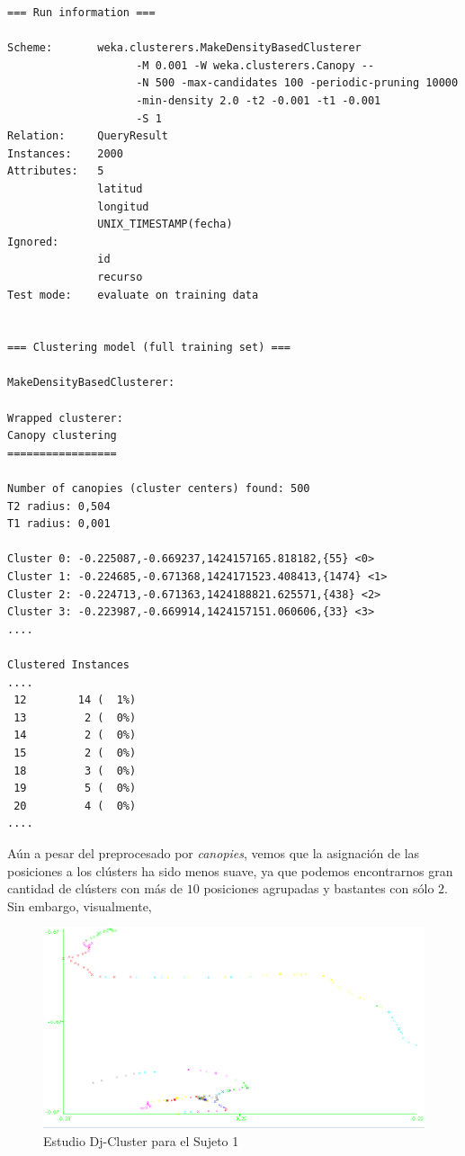 \documentclass[a4paper, 12pt]{article}
\begin{document}
\begin{verbatim}
=== Run information ===

Scheme:       weka.clusterers.MakeDensityBasedClusterer 
					-M 0.001 -W weka.clusterers.Canopy -- 
					-N 500 -max-candidates 100 -periodic-pruning 10000 
					-min-density 2.0 -t2 -0.001 -t1 -0.001 
					-S 1 
Relation:     QueryResult
Instances:    2000
Attributes:   5
              latitud
              longitud
              UNIX_TIMESTAMP(fecha)
Ignored:
              id
              recurso
Test mode:    evaluate on training data


=== Clustering model (full training set) ===

MakeDensityBasedClusterer: 

Wrapped clusterer: 
Canopy clustering
=================

Number of canopies (cluster centers) found: 500
T2 radius: 0,504     
T1 radius: 0,001     

Cluster 0: -0.225087,-0.669237,1424157165.818182,{55} <0>
Cluster 1: -0.224685,-0.671368,1424171523.408413,{1474} <1>
Cluster 2: -0.224713,-0.671363,1424188821.625571,{438} <2>
Cluster 3: -0.223987,-0.669914,1424157151.060606,{33} <3>
....

Clustered Instances
....
 12        14 (  1%)
 13         2 (  0%)
 14         2 (  0%)
 15         2 (  0%)
 18         3 (  0%)
 19         5 (  0%)
 20         4 (  0%)
....
\end{verbatim} 

A\'un a pesar del preprocesado por \textit{canopies}, vemos que la asignaci\'on de las posiciones a los cl\'usters ha sido menos suave, ya que podemos encontrarnos gran cantidad de cl\'usters con m\'as de $10$ posiciones agrupadas y bastantes con s\'olo $2$. Sin embargo, visualmente, \\

\begin{figure}[H]
	\includegraphics[scale=.5]{../comparativa/djClusterSujeto1.png}
	\caption{Estudio Dj-Cluster para el Sujeto 1}
\end{figure}
\end{document}
